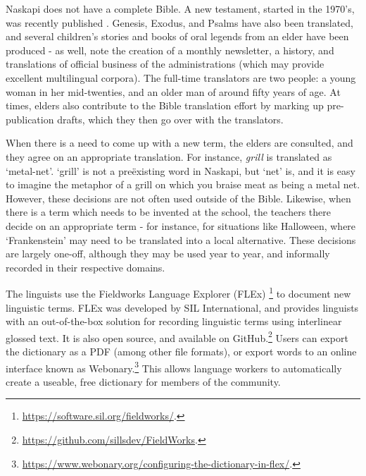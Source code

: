 Naskapi does not have a complete Bible. A new testament, started in the 1970's, was recently published \citep{naskapi-new-testament}. Genesis, Exodus, and Psalms have also been translated, and several children's stories and books of oral legends from an elder have been produced - as well, \citet{jancewicz2002applied} note the creation of a monthly newsletter, a history, and translations of official business of the administrations (which may provide excellent multilingual corpora). The full-time translators are two people: a young woman in her mid-twenties, and an older man of around fifty years of age. At times, elders also contribute to the Bible translation effort by marking up pre-publication drafts, which they then go over with the translators.

When there is a need to come up with a new term, the elders are consulted, and they agree on an appropriate translation. For instance, {\it grill} is translated as `metal-net'. `grill' is not a  pre\"{e}xisting word in Naskapi, but `net' is, and it is easy to imagine the metaphor of a grill on which you braise meat as being a metal net. However, these decisions are not often used outside of the Bible. Likewise, when there is a term which needs to be invented at the school, the teachers there decide on an appropriate term - for instance, for situations like Halloween, where `Frankenstein' may need to be translated into a local alternative. These decisions are largely one-off, although they may be used year to year, and informally recorded in their respective domains.

The linguists use the Fieldworks Language Explorer (FLEx) \footnote{\href{https://software.sil.org/fieldworks/}{https://software.sil.org/fieldworks/}. } to document new linguistic terms. FLEx was developed by SIL International, and provides linguists with an out-of-the-box solution for recording linguistic terms using interlinear glossed text. It is also open source, and available on GitHub.\footnote{\href{https://github.com/sillsdev/FieldWorks}{https://github.com/sillsdev/FieldWorks}. } Users can export the dictionary as a PDF (among other file formats), or export words to an online interface known as Webonary.\footnote{\href{https://www.webonary.org/configuring-the-dictionary-in-flex/}{https://www.webonary.org/configuring-the-dictionary-in-flex/}. } This allows language workers to automatically create a useable, free dictionary for members of the community.

